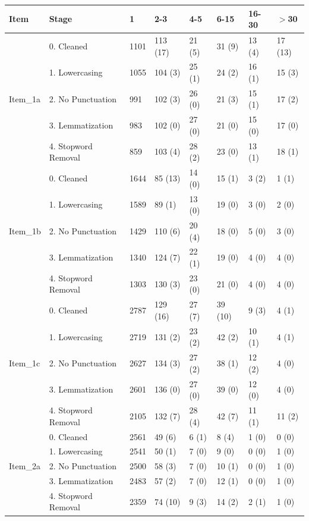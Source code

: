 \begin{longtable}{llllllll}
  \hline
Item & Stage & 1 & 2-3 & 4-5 & 6-15 & 16-30 & $>$30 \\ 
  \hline 
 \hline
 & 0. Cleaned & 1101 & 113 (17) & 21 (5) & 31 (9) & 13 (4) & 17 (13) \\ 
   & 1. Lowercasing & 1055 & 104 (3) & 25 (1) & 24 (2) & 16 (1) & 15 (3) \\ 
  Item\_1a & 2. No Punctuation & 991 & 102 (3) & 26 (0) & 21 (3) & 15 (1) & 17 (2) \\ 
   & 3. Lemmatization & 983 & 102 (0) & 27 (0) & 21 (0) & 15 (0) & 17 (0) \\ 
   & 4. Stopword Removal & 859 & 103 (4) & 28 (2) & 23 (0) & 13 (1) & 18 (1) \\ 
   \hline 
 & 0. Cleaned & 1644 & 85 (13) & 14 (0) & 15 (1) & 3 (2) & 1 (1) \\ 
   & 1. Lowercasing & 1589 & 89 (1) & 13 (0) & 19 (0) & 3 (0) & 2 (0) \\ 
  Item\_1b & 2. No Punctuation & 1429 & 110 (6) & 20 (4) & 18 (0) & 5 (0) & 3 (0) \\ 
   & 3. Lemmatization & 1340 & 124 (7) & 22 (1) & 19 (0) & 4 (0) & 4 (0) \\ 
   & 4. Stopword Removal & 1303 & 130 (3) & 23 (0) & 21 (0) & 4 (0) & 4 (0) \\ 
   \hline 
 & 0. Cleaned & 2787 & 129 (16) & 27 (7) & 39 (10) & 9 (3) & 4 (1) \\ 
   & 1. Lowercasing & 2719 & 131 (2) & 23 (2) & 42 (2) & 10 (1) & 4 (1) \\ 
  Item\_1c & 2. No Punctuation & 2627 & 134 (3) & 27 (2) & 38 (1) & 12 (2) & 4 (0) \\ 
   & 3. Lemmatization & 2601 & 136 (0) & 27 (0) & 39 (0) & 12 (0) & 4 (0) \\ 
   & 4. Stopword Removal & 2105 & 132 (7) & 28 (4) & 42 (7) & 11 (1) & 11 (2) \\ 
   \hline 
 & 0. Cleaned & 2561 & 49 (6) & 6 (1) & 8 (4) & 1 (0) & 0 (0) \\ 
   & 1. Lowercasing & 2541 & 50 (1) & 7 (0) & 9 (0) & 0 (0) & 1 (0) \\ 
  Item\_2a & 2. No Punctuation & 2500 & 58 (3) & 7 (0) & 10 (1) & 0 (0) & 1 (0) \\ 
   & 3. Lemmatization & 2483 & 57 (2) & 7 (0) & 12 (1) & 0 (0) & 1 (0) \\ 
   & 4. Stopword Removal & 2359 & 74 (10) & 9 (3) & 14 (2) & 2 (1) & 1 (0) \\ 

\end{longtable}
